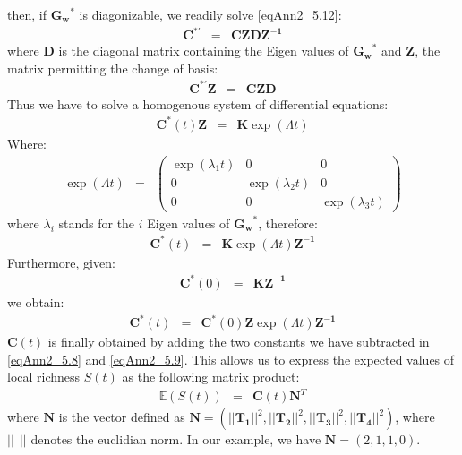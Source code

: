 then, if $\mathbf{G_w}^*$ is diagonizable, we readily solve \eqref{eqAnn2_5.12}:
\begin{eqnarray}
\mathbf{C}^{*'}&=&\mathbf{CZDZ^{-1}}
\end{eqnarray}
where $\mathbf{D}$ is the diagonal matrix containing the Eigen values of $\mathbf{G_w}^*$ and $\mathbf{Z}$, the matrix permitting the change of basis:
\begin{eqnarray}
\mathbf{C}^{*'}\mathbf{Z}&=&\mathbf{CZD}
\end{eqnarray}
Thus we have to solve a homogenous system of differential equations:
\begin{eqnarray}
\mathbf{C}^{*}(t)\mathbf{Z}&=&\mathbf{K}\exp(\Lambda t)
\end{eqnarray}
Where:
\begin{eqnarray}
\nonumber \exp(\Lambda t)&=&
\left(\begin{array}{cccc}
\exp(\lambda_1t) & 0 & 0 \\
0 & \exp(\lambda_2t) & 0  \\
0  & 0 & \exp(\lambda_3t)
\end{array}\right)
\end{eqnarray}
where $\lambda_i$ stands for the $i$ Eigen values of $\mathbf{G_w}^*$, therefore:
\begin{eqnarray}
\mathbf{C}^{*}(t)&=&\mathbf{K}\exp(\Lambda t)\mathbf{Z^{-1}}
\end{eqnarray}
Furthermore, given:
\begin{eqnarray}
\mathbf{C}^{*}(0)&=&\mathbf{KZ^{-1}}
\end{eqnarray}
we obtain:
\begin{eqnarray}
\mathbf{C}^{*}(t)&=&\mathbf{C}^{*}(0)\mathbf{Z}\exp(\Lambda t)\mathbf{Z^{-1}}
\end{eqnarray}
$\mathbf{C}(t)$ is finally obtained by adding the two constants we have subtracted in \eqref{eqAnn2_5.8} and \eqref{eqAnn2_5.9}. This allows us to express the expected values of local richness $S(t)$ as the following matrix product:
\begin{eqnarray}
\label{eqAnn2_5.19} \mathbb{E}({S}(t))&=&\mathbf{C}(t)\mathbf{N}^T
\end{eqnarray}
where $\mathbf{N}$ is the vector defined as  $\mathbf{N}=(||\mathbf{T_1}||^2, ||\mathbf{T_2}||^2, ||\mathbf{T_3}||^2, ||\mathbf{T_4}||^2)$, where $||~~||$ denotes the euclidian norm. In our example, we have $\mathbf{N}=(2,1,1,0)$.


